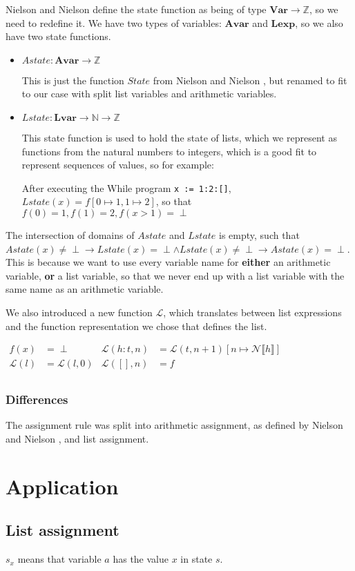 \documentclass[12pt]{article}
\newcommand\mono\texttt
\newcommand{\dblbr}[1]{\llbracket#1\rrbracket}
\newcommand{\LL}{\mathcal{L}}
\newcommand{\NN}{\mathcal{N}}
\newcommand{\Var}{\mathbf{Var}}
\newcommand{\Avar}{\mathbf{Avar}}
\newcommand{\Lvar}{\mathbf{Lvar}}
\newcommand{\Lexp}{\mathbf{Lexp}}
\begin{document}
Nielson and Nielson define the state function as being of type $\Var \rightarrow \mathbb{Z}$, so we need to redefine it. We have two types of variables: $\Avar$ and $\Lexp$, so we also have two state functions.

\begin{itemize}
    \item $Astate: \Avar \rightarrow \mathbb{Z}$

    This is just the function $State$ from Nielson and Nielson \cite{wiley}, but renamed to fit to our case with split list variables and arithmetic variables.
    \item $Lstate: \Lvar \rightarrow \mathbb{N} \rightarrow \mathbb{Z}$

    This state function is used to hold the state of lists, which we represent as functions from the natural numbers to integers, which is a good fit to represent sequences of values, so for example:

    After executing the While program \mono{x := 1:2:[]}, $Lstate(x) = f[0 \mapsto 1, 1 \mapsto 2]$, so that $f(0) = 1, f(1) = 2, f(x > 1) = \perp$
\end{itemize}

The intersection of domains of $Astate$ and $Lstate$ is empty, such that $Astate(x) \neq \perp \rightarrow Lstate(x) = \perp \land Lstate(x) \neq \perp \rightarrow Astate(x) = \perp$. This is because we want to use every variable name for \textbf{either} an arithmetic variable, \textbf{or} a list variable, so that we never end up with a list variable with the same name as an arithmetic variable.

We also introduced a new function $\LL$, which translates between list expressions and the function representation we chose that defines the list.

$\begin{aligned}
    f(x) &= \perp & \LL(h:t, n) &= \LL(t, n + 1)[n \mapsto \NN \dblbr{h}]\\
    \LL(l) &= \LL(l, 0) & \LL([], n) &= f\\
\end{aligned}$

\subsubsection{Differences}

The assignment rule was split into arithmetic assignment, as defined by Nielson and Nielson \cite{wiley}, and list assignment.

\section{Application}

\subsection{List assignment}
$s_x$ means that variable $a$ has the value $x$ in state $s$.

\begin{mathpar}
\end{mathpar}

\printbibliography
\end{document}
